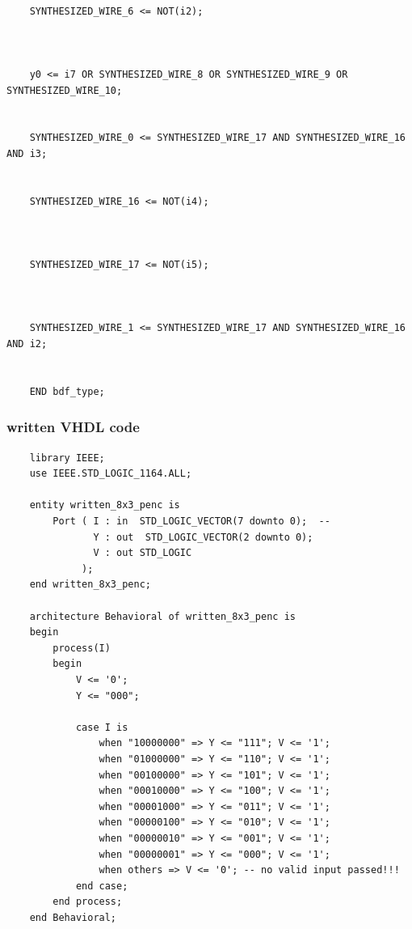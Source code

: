 \documentclass[12pt]{article}
\begin{document}
\begin{verbatim}
    
    SYNTHESIZED_WIRE_6 <= NOT(i2);
    
    
    
    y0 <= i7 OR SYNTHESIZED_WIRE_8 OR SYNTHESIZED_WIRE_9 OR SYNTHESIZED_WIRE_10;
    
    
    SYNTHESIZED_WIRE_0 <= SYNTHESIZED_WIRE_17 AND SYNTHESIZED_WIRE_16 AND i3;
    
    
    SYNTHESIZED_WIRE_16 <= NOT(i4);
    
    
    
    SYNTHESIZED_WIRE_17 <= NOT(i5);
    
    
    
    SYNTHESIZED_WIRE_1 <= SYNTHESIZED_WIRE_17 AND SYNTHESIZED_WIRE_16 AND i2;
    
    
    END bdf_type;

\end{verbatim}

\subsubsection{written VHDL code}
\begin{verbatim}
    library IEEE;
    use IEEE.STD_LOGIC_1164.ALL;
    
    entity written_8x3_penc is
        Port ( I : in  STD_LOGIC_VECTOR(7 downto 0);  --
               Y : out  STD_LOGIC_VECTOR(2 downto 0); 
               V : out STD_LOGIC                     
             );
    end written_8x3_penc;
    
    architecture Behavioral of written_8x3_penc is
    begin
        process(I)
        begin
            V <= '0';
            Y <= "000";
           
            case I is
                when "10000000" => Y <= "111"; V <= '1';
                when "01000000" => Y <= "110"; V <= '1';
                when "00100000" => Y <= "101"; V <= '1';
                when "00010000" => Y <= "100"; V <= '1';
                when "00001000" => Y <= "011"; V <= '1';
                when "00000100" => Y <= "010"; V <= '1';
                when "00000010" => Y <= "001"; V <= '1';
                when "00000001" => Y <= "000"; V <= '1';
                when others => V <= '0'; -- no valid input passed!!!
            end case;
        end process;
    end Behavioral;
\end{verbatim}
\end{document}
